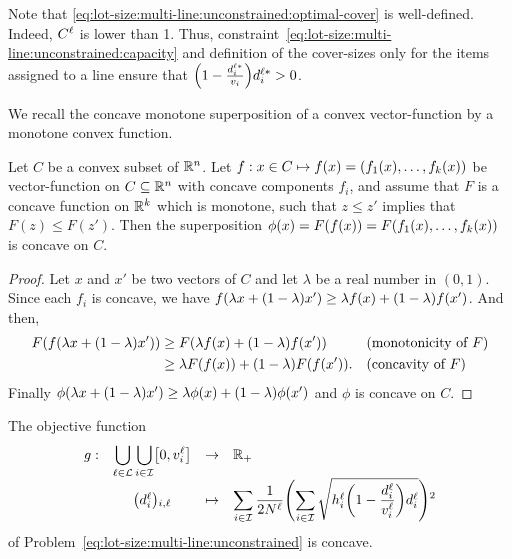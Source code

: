 Note that \cref{eq:lot-size:multi-line:unconstrained:optimal-cover} is well-defined.
Indeed, $C^{\ell}$ is lower than 1.
Thus, constraint~\eqref{eq:lot-size:multi-line:unconstrained:capacity} and definition of the cover-sizes only for the items assigned to a line ensure that $\bracket{1-\frac{\demand_i^{\ell*}}{\rate_i}}\demand_i^{\ell*}>0$.


We recall the concave monotone superposition of a convex vector-function by a monotone convex function.


\begin{lem}\label{lem:concave-monotone-superposition}
Let $C$ be a convex subset of $\mathbb{R}^n$.
Let $f:x\in C \mapsto f(x) = \bracket{f_1(x),\ldots,f_k(x)}$ be vector-function on $C\subseteq\mathbb{R}^n$ with concave components $f_i$, and assume that $F$ is a concave function on $\mathbb{R}^k$ which is monotone, \ie such that $z\le z'$ implies that $F(z)\le F(z')$.
Then the superposition $\phi(x) = F\bracket{f(x)}=F\bracket{f_1(x),\ldots,f_k(x)}$ is concave on $C$.
\end{lem}


\begin{proof}
Let $x$ and $x'$ be two vectors of $C$ and let $\lambda$ be a real number in $(0,1)$.
Since each $f_i$ is concave, we have
$f\bracket{\lambda x +(1-\lambda) x'} \ge \lambda f(x) + (1-\lambda) f(x')$.
And then,
\begin{subequations}
\begin{align}
  F\bracket{f\bracket{\lambda x +(1-\lambda) x'}}
  &\ge F\bracket{\lambda f(x) + (1-\lambda) f(x')}
  && \mbox{(monotonicity of $F$)}
  \\
  &\ge \lambda F\bracket{f(x)} + (1-\lambda) F\bracket{f(x')}.
  && \mbox{(concavity of $F$)}
\end{align}
\end{subequations}
Finally $\phi\bracket{\lambda x +(1-\lambda) x'} \ge \lambda \phi(x) + (1-\lambda) \phi(x')$ and $\phi$ is concave on $C$.
\end{proof}



\begin{lem}\label{lem:concave-objective-function}
The objective function
\begin{equation}
\begin{array}{rccl}
  g: & \ds\bigcup_{\ell\in\lines}\bigcup_{i\in\REF} \sqbracket{0,\rate_i^{\ell}} & \to & \RR_+ \\
     & \bracket{\demand_i^{\ell}}_{i,\ell} & \mapsto & \ds\sum_{i\in\REF} \frac{1}{2\nbsetups^{\ell}}\bracket{\sum_{i\in\REF}\sqrt{\holding_i^{\ell}\bracket{1-\frac{\demand_i^{\ell}}{\rate_i^{\ell}}}\demand_i^{\ell}}}^2
\end{array}
\end{equation}
of Problem~\eqref{eq:lot-size:multi-line:unconstrained} is concave.
\end{lem}


